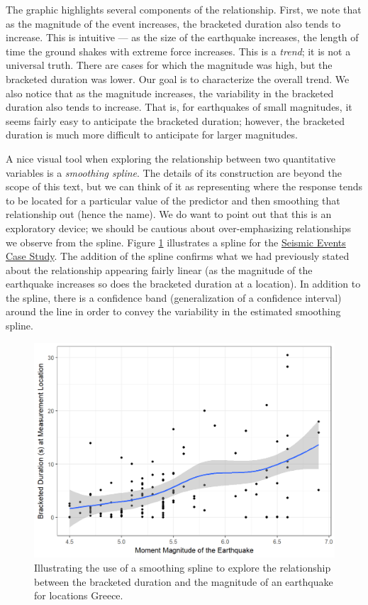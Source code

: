 \documentclass[]{book}
\theoremstyle{plain}
\theoremstyle{mydefn}
\theoremstyle{myexmpl}
\theoremstyle{remark}
\begin{document}
The graphic highlights several components of the relationship. First, we
note that as the magnitude of the event increases, the bracketed
duration also tends to increase. This is intuitive --- as the size of
the earthquake increases, the length of time the ground shakes with
extreme force increases. This is a \emph{trend}; it is not a universal
truth. There are cases for which the magnitude was high, but the
bracketed duration was lower. Our goal is to characterize the overall
trend. We also notice that as the magnitude increases, the variability
in the bracketed duration also tends to increase. That is, for
earthquakes of small magnitudes, it seems fairly easy to anticipate the
bracketed duration; however, the bracketed duration is much more
difficult to anticipate for larger magnitudes.

A nice visual tool when exploring the relationship between two
quantitative variables is a \emph{smoothing spline}. The details of its
construction are beyond the scope of this text, but we can think of it
as representing where the response tends to be located for a particular
value of the predictor and then smoothing that relationship out (hence
the name). We do want to point out that this is an exploratory device;
we should be cautious about over-emphasizing relationships we observe
from the spline. Figure \ref{fig:regsummaries-spline} illustrates a
spline for the \protect\hyperlink{CaseGreece}{Seismic Events Case
Study}. The addition of the spline confirms what we had previously
stated about the relationship appearing fairly linear (as the magnitude
of the earthquake increases so does the bracketed duration at a
location). In addition to the spline, there is a confidence band
(generalization of a confidence interval) around the line in order to
convey the variability in the estimated smoothing spline.

\begin{figure}

{\centering \includegraphics[width=0.8\linewidth]{./Images/regsummaries-spline-1} 

}

\caption{Illustrating the use of a smoothing spline to explore the relationship between the bracketed duration and the magnitude of an earthquake for locations Greece.}\label{fig:regsummaries-spline}
\end{figure}
\end{document}
